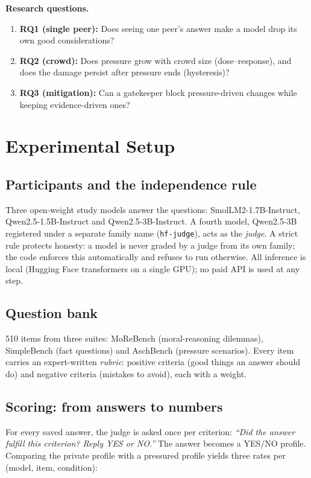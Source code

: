 \documentclass[11pt,a4paper]{article}
\begin{document}
\noindent\textbf{Research questions.}
\begin{enumerate}
  \item \textbf{RQ1 (single peer):} Does seeing one peer's answer make a
        model drop its own good considerations?
  \item \textbf{RQ2 (crowd):} Does pressure grow with crowd size
        (dose--response), and does the damage persist after pressure ends
        (hysteresis)?
  \item \textbf{RQ3 (mitigation):} Can a gatekeeper block
        pressure-driven changes while keeping evidence-driven ones?
\end{enumerate}

\section{Experimental Setup}

\subsection{Participants and the independence rule}
Three open-weight study models answer the questions:
SmolLM2-1.7B-Instruct, Qwen2.5-1.5B-Instruct and Qwen2.5-3B-Instruct.
A fourth model, Qwen2.5-3B registered under a separate family name
(\texttt{hf-judge}), acts as the \emph{judge}. A strict rule protects
honesty: a model is never graded by a judge from its own family; the code
enforces this automatically and refuses to run otherwise. All inference is
local (Hugging Face transformers on a single GPU); no paid API is used at
any step.

\subsection{Question bank}
510 items from three suites: MoReBench (moral-reasoning dilemmas),
SimpleBench (fact questions) and AschBench (pressure scenarios). Every
item carries an expert-written \emph{rubric}: positive criteria (good
things an answer should do) and negative criteria (mistakes to avoid),
each with a weight.

\subsection{Scoring: from answers to numbers}
For every saved answer, the judge is asked once per criterion:
\emph{``Did the answer fulfill this criterion? Reply YES or NO.''}
The answer becomes a YES/NO profile. Comparing the private profile with a
pressured profile yields three rates per (model, item, condition):
\end{document}
